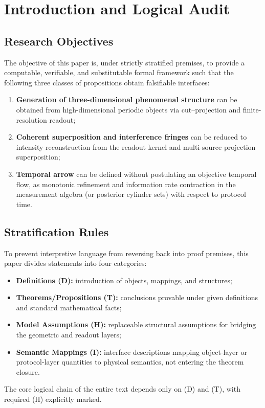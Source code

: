 \section{Introduction and Logical Audit}

\subsection{Research Objectives}

The objective of this paper is, under strictly stratified premises, to provide a computable, verifiable, and substitutable formal framework such that the following three classes of propositions obtain falsifiable interfaces:
\begin{enumerate}
  \item \textbf{Generation of three-dimensional phenomenal structure} can be obtained from high-dimensional periodic objects via cut--projection and finite-resolution readout;
  \item \textbf{Coherent superposition and interference fringes} can be reduced to intensity reconstruction from the readout kernel and multi-source projection superposition;
  \item \textbf{Temporal arrow} can be defined without postulating an objective temporal flow, as monotonic refinement and information rate contraction in the measurement algebra (or posterior cylinder sets) with respect to protocol time.
\end{enumerate}

\subsection{Stratification Rules}

To prevent interpretive language from reversing back into proof premises, this paper divides statements into four categories:
\begin{itemize}
  \item \textbf{Definitions (D):} introduction of objects, mappings, and structures;
  \item \textbf{Theorems/Propositions (T):} conclusions provable under given definitions and standard mathematical facts;
  \item \textbf{Model Assumptions (H):} replaceable structural assumptions for bridging the geometric and readout layers;
  \item \textbf{Semantic Mappings (I):} interface descriptions mapping object-layer or protocol-layer quantities to physical semantics, not entering the theorem closure.
\end{itemize}
The core logical chain of the entire text depends only on (D) and (T), with required (H) explicitly marked.

